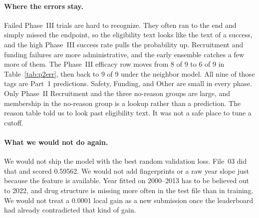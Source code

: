 \paragraph{Where the errors stay.}
Failed Phase~III trials are hard to recognize. They often ran to the end and
simply missed the endpoint, so the eligibility text looks like the text of a
success, and the high Phase~III success rate pulls the probability up.
Recruitment and funding failures are more administrative, and the early
ensemble catches a few more of them. The Phase~III efficacy row moves from
8 of 9 to 6 of 9 in Table~\ref{tab:p2err}, then back to 9 of 9 under the
neighbor model. All nine of those tags are Part~1 predictions. Safety,
Funding, and Other are small in every phase. Only Phase~II Recruitment and
the three no-reason groups are large, and membership in the no-reason group
is a lookup rather than a prediction. The reason table told us to look past
eligibility text. It was not a safe place to tune a cutoff.

\paragraph{What we would not do again.}
We would not ship the model with the best random validation loss. File~03
did that and scored 0.59562. We would not add fingerprints or a raw year
slope just because the feature is available. Year fitted on 2000--2013 has
to be believed out to 2022, and drug structure is missing more often in the
test file than in training. We would not treat a 0.0001 local gain as a new
submission once the leaderboard had already contradicted that kind of gain.

